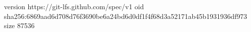 version https://git-lfs.github.com/spec/v1
oid sha256:6869aad6d708d76f3690be6a24bd6d0df1f4f68d3a52171ab45b1931936df973
size 87536
